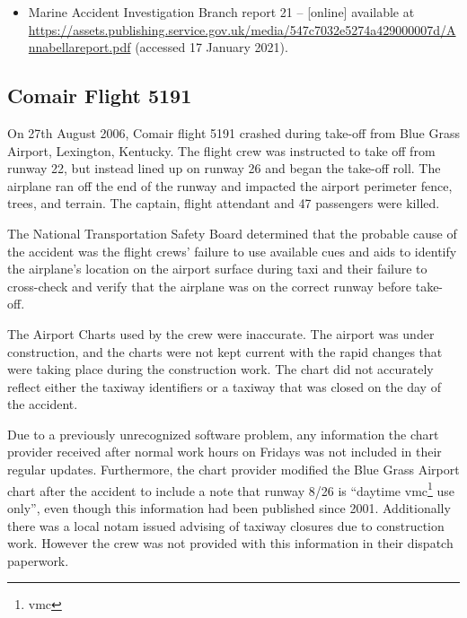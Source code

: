 \begin{itemize}
\item Marine Accident Investigation Branch report 21 --  [online] available at \href{https://assets.publishing.service.gov.uk/media/547c7032e5274a429000007d/Annabellareport.pdf}{https://assets.publishing.service.gov.uk/media/547c7032e5274a429000007d/Annabellareport.pdf} (accessed 17 January 2021).
\end{itemize}

\subsection{Comair Flight 5191} \label{bkm:incacc:comair5191}
On 27th August 2006, Comair flight 5191 crashed during take-off from Blue Grass Airport, Lexington, Kentucky. The flight crew was instructed to take off from runway 22, but instead lined up on runway 26 and began the take-off roll. The airplane ran off the end of the runway and impacted the airport perimeter fence, trees, and terrain. The captain, flight attendant and 47 passengers were killed.

The National Transportation Safety Board determined that the probable cause of the accident was the flight crews' failure to use available cues and aids to identify the airplane's location on the airport surface during taxi and their failure to cross-check and verify that the airplane was on the correct runway before take-off.

The Airport Charts used by the crew were inaccurate. The airport was under construction, and the charts were not kept current with the rapid changes that were taking place during the construction work. The chart did not accurately reflect either the taxiway identifiers or a taxiway that was closed on the day of the accident.

Due to a previously unrecognized software problem, any \gls{information} the chart provider received after normal work hours on Fridays was not included in their regular updates. Furthermore, the chart provider modified the Blue Grass Airport chart after the accident to include a note that runway 8/26 is ``daytime \acrshort{vmc}\footnote{\acrlong{vmc}} use only'', even though this \gls{information} had been published since 2001. Additionally there was a local \gls{notam} issued advising of taxiway closures due to construction work. However the crew was not provided with this \gls{information} in their dispatch paperwork.


